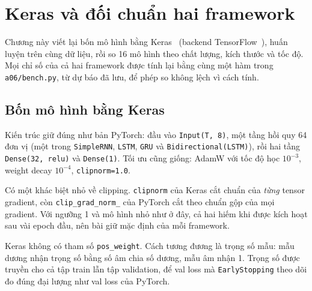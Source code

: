\chapter{Keras và đối chuẩn hai framework}
\label{ch:keras}

Chương này viết lại bốn mô hình bằng Keras~\cite{chollet2015} (backend TensorFlow~\cite{abadi2016}), huấn luyện trên
cùng dữ liệu, rồi so 16 mô hình theo chất lượng, kích thước và tốc độ. Mọi chỉ số của cả hai framework được tính lại bằng
cùng một hàm trong \texttt{a06/bench.py}, từ dự báo đã lưu, để phép so không lệch vì cách tính.

\section{Bốn mô hình bằng Keras}

Kiến trúc giữ đúng như bản PyTorch: đầu vào \texttt{Input(T, 8)}, một tầng hồi quy 64 đơn vị (một trong
\texttt{SimpleRNN}, \texttt{LSTM}, \texttt{GRU} và \texttt{Bidirectional(LSTM)}), rồi hai tầng \texttt{Dense(32, relu)}
và \texttt{Dense(1)}. Tối ưu cũng giống:
AdamW với tốc độ học $10^{-3}$, weight decay $10^{-4}$, \texttt{clipnorm=1.0}.


Có một khác biệt nhỏ về clipping. \texttt{clipnorm} của Keras cắt chuẩn của \emph{từng} tensor gradient, còn
\texttt{clip\_grad\_norm\_} của PyTorch cắt theo chuẩn gộp của mọi gradient. Với ngưỡng 1 và mô hình nhỏ như ở đây, cả hai
hiếm khi được kích hoạt sau vài epoch đầu, nên bài giữ mặc định của mỗi framework.

Keras không có tham số \texttt{pos\_weight}. Cách tương đương là trọng số mẫu: mẫu dương nhận trọng số bằng số âm chia số
dương, mẫu âm nhận 1. Trọng số được truyền cho cả tập train lẫn tập validation, để val loss mà \texttt{EarlyStopping}
theo dõi đo đúng đại lượng như val loss của PyTorch.



